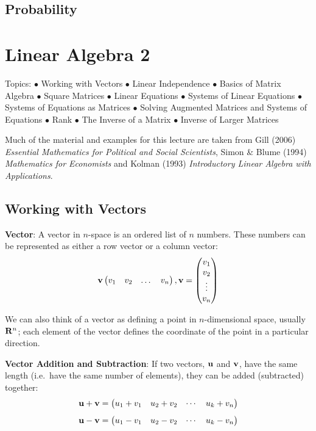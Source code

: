 \documentclass[]{book}
\theoremstyle{definition}
\theoremstyle{definition}
\theoremstyle{definition}
\theoremstyle{remark}
\begin{document}
\section{Probability}\label{probability}

\chapter{Linear Algebra 2}\label{linear-algebra-2}

Topics: \(\bullet\) Working with Vectors \(\bullet\) Linear Independence
\(\bullet\) Basics of Matrix Algebra \(\bullet\) Square Matrices
\(\bullet\) Linear Equations \(\bullet\) Systems of Linear Equations
\(\bullet\) Systems of Equations as Matrices \(\bullet\) Solving
Augmented Matrices and Systems of Equations \(\bullet\) Rank \(\bullet\)
The Inverse of a Matrix \(\bullet\) Inverse of Larger Matrices

Much of the material and examples for this lecture are taken from Gill
(2006) \emph{Essential Mathematics for Political and Social Scientists},
Simon \& Blume (1994) \emph{Mathematics for Economists} and Kolman
(1993) \emph{Introductory Linear Algebra with Applications}.

\section{Working with Vectors}\label{working-with-vectors}

\textbf{Vector}: A vector in \(n\)-space is an ordered list of \(n\)
numbers. These numbers can be represented as either a row vector or a
column vector:
\[ {\bf v} \begin{pmatrix} v_1 & v_2 & \dots & v_n\end{pmatrix} , {\bf v} = \begin{pmatrix} v_1 \\ v_2 \\ \vdots \\ v_n \end{pmatrix}\]

We can also think of a vector as defining a point in \(n\)-dimensional
space, usually \({\bf R}^n\); each element of the vector defines the
coordinate of the point in a particular direction.

\textbf{Vector Addition and Subtraction}: If two vectors, \({\bf u}\)
and \({\bf v}\), have the same length (i.e.~have the same number of
elements), they can be added (subtracted) together:
\[ {\bf u} + {\bf v} = \begin{pmatrix} u_1 + v_1 & u_2 + v_2 & \cdots & u_k + v_n \end{pmatrix}\]
\[ {\bf u} - {\bf v} = \begin{pmatrix} u_1 - v_1 & u_2 - v_2 & \cdots & u_k - v_n \end{pmatrix}\]
\end{document}
